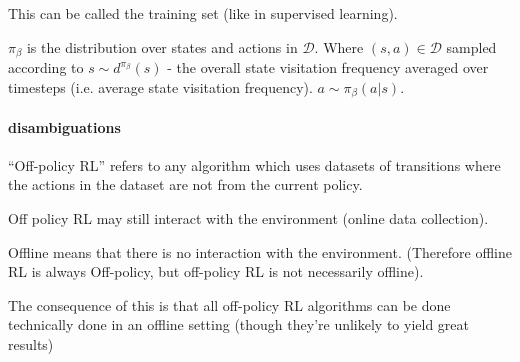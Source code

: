 \documentclass{article}
\begin{document}
This can be called the training set (like in supervised learning).


\(\pi_{\beta}\) is the distribution over states and actions in \(\mathcal{D}\). Where \( (s,a) \in \mathcal{D} \) sampled according to \(s \sim d^{\pi_{\beta}}(s)\) - the overall state visitation frequency averaged over timesteps (i.e. average state visitation frequency). \(a \sim \pi_{\beta} (a | s)\).

\paragraph{disambiguations}
``Off-policy RL'' refers to any algorithm which uses datasets of transitions where the actions in the dataset are not from the current policy.


Off policy RL may still interact with the environment (online data collection).


Offline means that there is no interaction with the environment.
(Therefore offline RL is always Off-policy, but off-policy RL is not necessarily offline).


The consequence of this is that all off-policy RL algorithms can be done technically done in an offline setting (though they're unlikely to yield great results)
\end{document}

